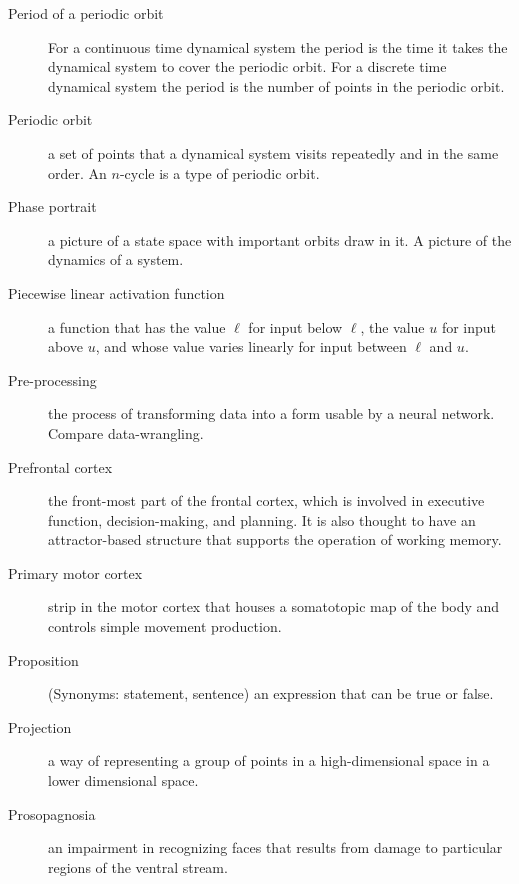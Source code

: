 \begin{description}

\item[Period of a periodic orbit] For a continuous time dynamical system the period is the time it takes the dynamical system to cover the periodic orbit. For a discrete time dynamical system the period is the number of points in the periodic orbit.

\item[Periodic orbit] a set of points that a dynamical system visits repeatedly and in the same order. An $n$-cycle is a type of periodic orbit.

\item[Phase portrait] a picture of a state space with important orbits draw in it. A picture of the dynamics of a system.

\item[Piecewise linear activation function] a function that has the value $\ell$ for input below $\ell$, the value $u$ for input above $u$, and whose  value varies linearly for input between $\ell$ and $u$. 

\item[Pre-processing] the process of transforming data into a form usable by a neural network. Compare data-wrangling.


\item[Prefrontal cortex] the front-most part of the frontal cortex, which is involved in executive function, decision-making, and planning. It is also thought to have an attractor-based structure that supports the operation of working memory.

\item[Primary motor cortex] strip in the motor cortex that houses a somatotopic map of the body and controls simple movement production. 

\item[Proposition]  (Synonyms: statement, sentence) an expression that can be true or false.

\item[Projection] a way of representing a group of points in a high-dimensional space in a lower dimensional space.

\item[Prosopagnosia] an impairment in recognizing faces that results from damage to particular regions of the ventral stream.


\end{description}
